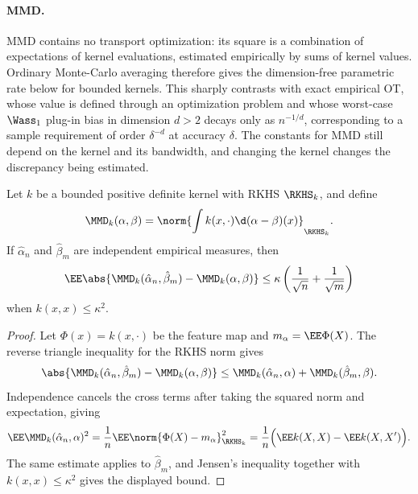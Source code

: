 \paragraph{MMD.}
MMD contains no transport optimization: its square is a combination of expectations of kernel evaluations, estimated empirically by sums of kernel values. Ordinary Monte-Carlo averaging therefore gives the dimension-free parametric rate below for bounded kernels. This sharply contrasts with exact empirical OT, whose value is defined through an optimization problem and whose worst-case \(\Wass_1\) plug-in bias in dimension \(d>2\) decays only as \(n^{-1/d}\), corresponding to a sample requirement of order \(\delta^{-d}\) at accuracy \(\delta\). The constants for MMD still depend on the kernel and its bandwidth, and changing the kernel changes the discrepancy being estimated.

\begin{prop}\label{prop-mmd-sample-rate}
	Let $k$ be a bounded positive definite kernel with RKHS $\RKHS_k$, and define
	\[
		\MMD_k(\alpha,\beta)
		=
		\norm{\int k(x,\cdot)\d(\alpha-\beta)(x)}_{\RKHS_k}.
	\]
	If $\hat\alpha_n$ and $\hat\beta_m$ are independent empirical measures, then
	\[
		\EE\abs{\MMD_k(\hat\alpha_n,\hat\beta_m)-\MMD_k(\alpha,\beta)}
\index{maximum mean discrepancy}%
		\leq
		\kappa\left(\frac1{\sqrt n}+\frac1{\sqrt m}\right)
	\]
	when $k(x,x)\leq\kappa^2$.
\end{prop}

\begin{proof}
	Let $\Phi(x)=k(x,\cdot)$ be the feature map and $m_\alpha=\EE\Phi(X)$. The reverse triangle inequality for the RKHS norm gives
	\[
		\abs{\MMD_k(\hat\alpha_n,\hat\beta_m)-\MMD_k(\alpha,\beta)}
\index{maximum mean discrepancy}%
		\leq
		\MMD_k(\hat\alpha_n,\alpha)+\MMD_k(\hat\beta_m,\beta).
	\]
	Independence cancels the cross terms after taking the squared norm and expectation, giving
	\[
		\EE\MMD_k(\hat\alpha_n,\alpha)^2
		=\frac1n\EE\norm{\Phi(X)-m_\alpha}_{\RKHS_k}^2
		=\frac{1}{n}\Big(\EE k(X,X)-\EE k(X,X')\Big).
	\]
	The same estimate applies to $\hat\beta_m$, and Jensen's inequality together with $k(x,x)\leq\kappa^2$ gives the displayed bound.
\end{proof}

